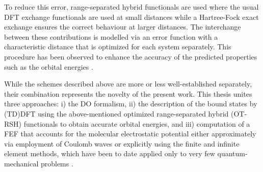 To reduce this error, range-separated hybrid functionals are used where the usual DFT exchange functionals are used at small distances while a Hartree-Fock exact exchange ensures the correct behaviour at larger distances.
The interchange between these contributions is modelled via an error function with a characteristic distance that is optimized for each system separately.
This procedure has been observed to enhance the accuracy of the predicted properties such as the orbital energies \cite{Bokareva,GrellKuehn, Gerber, Gerber2}.

While the schemes described above are more or less well-established separately, their combination represents the novelty of the present work.
This thesis unites three approaches: i) the DO formalism, ii) the description of the bound states by (TD)DFT using the above-mentioned optimized range-separated hybrid (OT-RSH) functionals to obtain accurate orbital energies, and iii) computation of a FEF that accounts for the molecular electrostatic potential either approximately via employment of Coulomb waves or explicitly using the finite and infinite element methods, which have been to date applied only to very few quantum-mechanical problems \cite{sobaMolecule,bettessHarmonic}.

